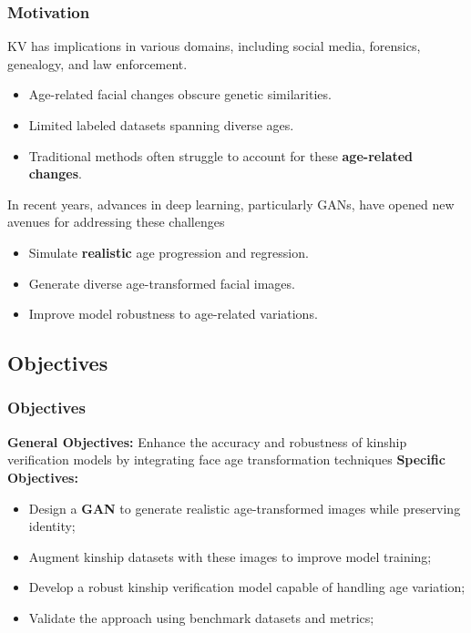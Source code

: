 \documentclass[aspectratio=169]{beamer}
\begin{document}
\begin{frame}
\frametitle{Motivation}

KV has implications in various domains, including social media, forensics, genealogy, and law enforcement.

\begin{itemize}
    \item Age-related facial changes obscure genetic similarities.
    \item Limited labeled datasets spanning diverse ages.
    \item Traditional methods often struggle to account for these \textbf{age-related changes}.
    \newline
\end{itemize}

\pause
In recent years, advances in deep learning, particularly GANs, have opened new avenues for addressing these challenges

\begin{itemize}
    \item Simulate \textbf{realistic} age progression and regression.
    \item Generate diverse age-transformed facial images.
    \item Improve model robustness to age-related variations.
\end{itemize}

\end{frame}


\subsection{Objectives}

\begin{frame}
\frametitle{Objectives}
\textbf{General Objectives:} Enhance the accuracy and robustness of kinship verification models by integrating face age transformation techniques
\newline\newline
\textbf{Specific Objectives:}
\begin{itemize}
    \item Design a \textbf{GAN} to generate realistic age-transformed images while preserving identity;

    \item Augment kinship datasets with these images to improve model training;

    \item Develop a robust kinship verification model capable of handling age variation;

    \item Validate the approach using benchmark datasets and metrics;
\end{itemize}
\end{frame}
\end{document}

